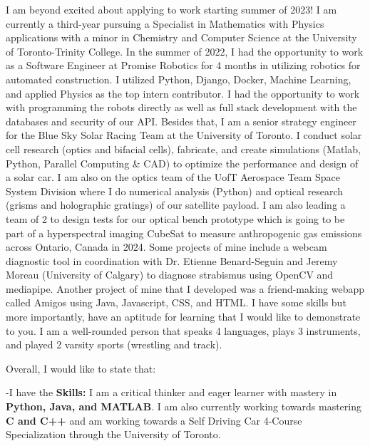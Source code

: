 \documentclass[11pt,a4]{article}
\newcommand{\bold}[1]{ {\bfseries #1}}
\begin{document}
I am beyond excited about applying to work starting summer of 2023! 
I am currently a third-year pursuing a Specialist in
 Mathematics with Physics applications with a minor 
 in Chemistry and Computer Science at the University
  of Toronto-Trinity College. In the summer of 2022,
   I had the opportunity to work as a Software Engineer
    at Promise Robotics for 4 months in utilizing robotics
     for automated construction. I utilized Python, Django,
      Docker, Machine Learning, and applied Physics as the
       top intern contributor. I had the opportunity to work
        with programming the robots directly as well as full 
        stack development with the databases and security of
         our API. Besides that, I am a senior strategy 
         engineer for the Blue Sky Solar Racing Team at 
         the University of Toronto. I conduct solar cell
          research (optics and bifacial cells), fabricate,
           and create simulations (Matlab, Python, Parallel 
           Computing \& CAD) to optimize the performance and
            design of a solar car. I am also on the optics 
            team of the UofT Aerospace Team Space System
             Division where I do numerical analysis (Python) 
             and optical research (grisms and holographic 
             gratings) of our satellite payload. I am also leading a team of 2 to 
             design tests for our optical bench prototype
              which is going to be part of a hyperspectral 
              imaging CubeSat to measure anthropogenic gas 
              emissions across Ontario, Canada in 2024.
               Some projects of mine include a webcam 
               diagnostic tool in coordination with Dr.
                Etienne Benard-Seguin and Jeremy Moreau
                 (University of Calgary) to diagnose 
                 strabismus using OpenCV and mediapipe. 
                 Another project of mine that I developed
                  was a friend-making webapp called Amigos
                   using Java, Javascript, CSS, and HTML.
                    I have some skills but more importantly,
                     have an aptitude for learning that I 
                     would like to demonstrate to you. I am
                      a well-rounded person that speaks 4
                      languages, plays 3 instruments, and 
                      played 2 varsity sports (wrestling and 
                      track). \par
     Overall, I would like to state that:


-I have the \bold{Skills:} I am a critical thinker and eager learner with mastery in
\bold{Python, Java, and MATLAB}. I am also currently working towards mastering
\bold{C and C++} and am working towards a Self Driving Car 4-Course Specialization
through the University of Toronto.\par
\end{document}
